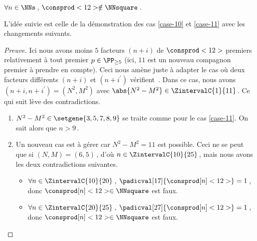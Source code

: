 \begin{fact} \label{case-12}
	 $\forall n \in \NNs$\,, $\consprod<12> \notin \NNsquare$\,.
\end{fact}



L'idée suivie est celle de la démonstration des cas \ref{case-10} et \ref{case-11} avec les changements suivants.


\begin{proof}[Preuve]%
    Ici nous avons moins $5$ facteurs $(n + i)$ de $\consprod<12>$ premiers relativement à tout premier $p \in \PP_{\geq 5}$ (ici, $11$ est un nouveau compagnon premier à prendre en compte).
    Ceci nous amène juste à adapter le cas où deux facteurs différents $(n+i)$ et $(n+i^\prime)$ vérifient \,.
    Dans ce cas, nous avons $(n+i, n+i^\prime) = (N^2, M^2)$ avec $\abs{N^2 - M^2} \in \ZintervalC{1}{11}$\,. Ce qui suit lève des contradictions.
	\begin{enumerate}
		\item $N^2 - M^2 \in \setgene{3, 5, 7, 8, 9}$ se traite comme pour le cas \ref{case-11}. On sait alors que $n > 9$\,.

			
		\item Un nouveau cas est à gérer car $N^2 - M^2 = 11$ est possible.
		Ceci ne se peut que si $(N, M) = (6, 5)$\,, d'où $n \in \ZintervalC{10}{25}$\,, mais nous avons les deux contradictions suivantes.
		\begin{itemize}
			\item $\forall n \in \ZintervalC{10}{20}$\,, 
			$\padicval[17]{\consprod[n]<12>} = 1$\,, donc $\consprod[n]<12> \in \NNsquare$ est faux.

			\item $\forall n \in \ZintervalC{20}{25}$\,, 
			$\padicval[27]{\consprod[n]<12>} = 1$\,, donc $\consprod[n]<12> \in \NNsquare$ est faux.
		\qedhere
		\end{itemize}
	\end{enumerate}
\end{proof}

